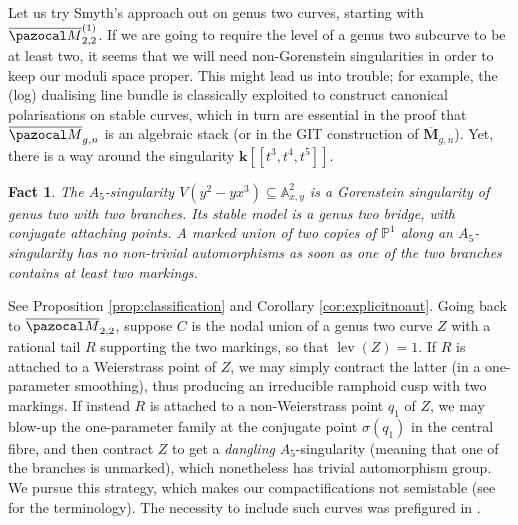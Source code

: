 \documentclass{compositio}
\newcommand{\PP}{\mathbb P}
\renewcommand{\k}{\mathbf k}
\newcommand{\Aaff}{\mathbb A}
\newcommand{\oM}{\overline{\pazocal M}}
\newcommand{\lev}{\operatorname{lev}}
\theoremstyle{plain}
\newtheorem*{fact}{Fact}
\theoremstyle{definition}
\theoremstyle{remark}
\begin{document}
Let us try Smyth's approach out on genus two curves, starting with $\oM_{2,2}^{(1)}$. If we are going to require the level of a genus two subcurve to be at least two, it seems that we will need non-Gorenstein singularities in order to keep our moduli space proper. This might lead us into trouble; for example, the (log) dualising line bundle is classically exploited to construct canonical polarisations on stable curves, which in turn are essential in the proof that $\oM_{g,n}$ is an algebraic stack (or in the GIT construction of $\overline{\mathbf M}_{g,n}$). Yet, there is a way around the singularity $\k[\![t^3,t^4,t^5]\!]$.
\begin{fact}
 The $A_5$-singularity $V(y^2-yx^3)\subseteq\Aaff^2_{x,y}$ is a Gorenstein singularity of genus two with two branches. Its stable model is a genus two bridge, with conjugate attaching points. A marked union of two copies of $\PP^1$ along an $A_5$-singularity has no non-trivial automorphisms as soon as one of the two branches contains at least two markings.
\end{fact}
See Proposition \ref{prop:classification} and Corollary \ref{cor:explicitnoaut}. Going back to $\oM_{2,2}$, suppose $C$ is the nodal union of a genus two curve $Z$ with a rational tail $R$ supporting the two markings, so that $\lev(Z)=1$. If $R$ is attached to a Weierstrass point of $Z$, we may simply contract the latter (in a one-parameter smoothing), thus producing an irreducible ramphoid cusp with two markings. If instead $R$ is attached to a non-Weierstrass point $q_1$ of $Z$, we may blow-up the one-parameter family at the conjugate point $\sigma(q_1)$ in the central fibre, and then contract $Z$ to get a \emph{dangling} $A_5$-singularity (meaning that one of the branches is unmarked), which nonetheless has trivial automorphism group. We pursue this strategy, which makes our compactifications not semistable (see \cite[Definition 1.2]{SMY-towards} for the terminology). The necessity to include such curves was prefigured in \cite{AFSGm}.
\end{document}
